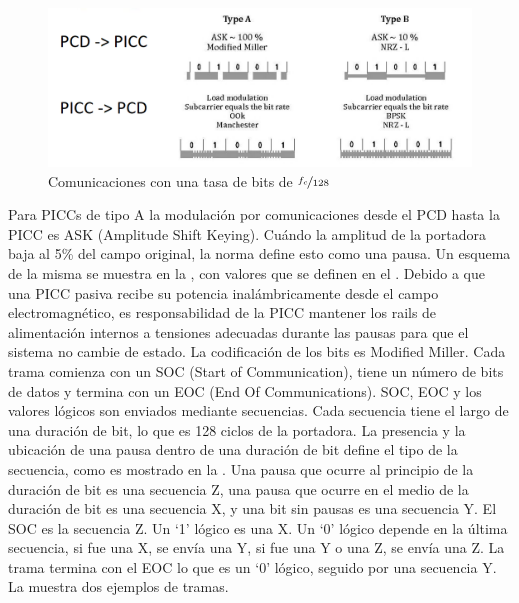 \documentclass[a4paper, twoside, 11pt]{report}
\begin{document}
\begin{figure}[htb]
\centering
\includegraphics[scale=0.47]{./img/modulation_and_bit_encoding}
\caption{Comunicaciones con una tasa de bits de $\nicefrac{f_c}{128}$~\cite[Modificaciones Mías]{iso14443-2}}
\label{fig:mod-encode}
\end{figure}

Para PICCs de tipo A la modulación por comunicaciones desde el PCD hasta la PICC es ASK (Amplitude Shift Keying). Cuándo la amplitud de la portadora baja al 5\% del campo original, la norma define esto como una pausa. Un esquema de la misma se muestra en la , con valores que se definen en el . Debido a que una PICC pasiva recibe su potencia inalámbricamente desde el campo electromagnético, es responsabilidad de la PICC mantener los rails de alimentación internos a tensiones adecuadas durante las pausas para que el sistema no cambie de estado. La codificación de los bits es Modified Miller. Cada trama comienza con un SOC (Start of Communication), tiene un número de bits de datos y termina con un EOC (End Of Communications). SOC, EOC y los valores lógicos son enviados mediante secuencias. Cada secuencia tiene el largo de una duración de bit, lo que es 128 ciclos de la portadora. La presencia y la ubicación de una pausa dentro de una duración de bit define el tipo de la secuencia, como es mostrado en la . Una pausa que ocurre al principio de la duración de bit es una secuencia Z, una pausa que ocurre en el medio de la duración de bit es una secuencia X, y una bit sin pausas es una secuencia Y. El SOC es la secuencia Z. Un ‘1’ lógico es una X. Un ‘0’ lógico depende en la última secuencia, si fue una X, se envía una Y, si fue una Y o una Z, se envía una Z. La trama termina con el EOC lo que es un ‘0’ lógico, seguido por una secuencia Y. La  muestra dos ejemplos de tramas.
\end{document}
